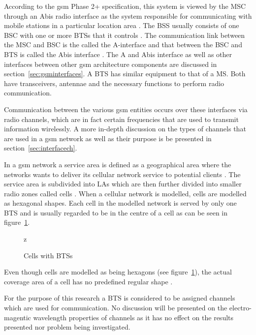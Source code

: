 According to the \gls{gsm} Phase 2+ specification, this system is viewed by the \gls{MSC} through an Abis radio interface as the system responsible for communicating with mobile stations in a particular location area \cite{Eisenblatter}. The \gls{BSS} usually consists of one \gls{BSC} with one or more \glspl{BTS} that it controls \cite{Eisenblatter}. The communication link between the \gls{MSC} and \gls{BSC} is the called the A-interface and that between the \gls{BSC} and \gls{BTS} is called the Abis interface \cite{Eisenblatter}. The A and Abis interface as well as other interfaces between other \gls{gsm} architecture components are discussed in section~\ref{sec:gsminterfaces}. A \gls{BTS} has similar equipment to that of a MS\cite{GSMSysEngin}. Both have transceivers, antennae and the necessary functions to perform radio communication. 

Communication between the various \gls{gsm} entities occurs over these interfaces via radio channels, which are in fact certain frequencies that are used to transmit information wirelessly. A more in-depth discussion on the types of channels that are used in a \gls{gsm} network as well as their purpose is be presented in section~\ref{sec:interfacech}.

In a \gls{gsm} network a service area is defined as a geographical area where the networks wants to deliver its cellular network service to potential clients \cite{GSMArchitectureProtocolsServices, Karen2004}. The service area is subdivided into \glspl{LA} which are then further divided into smaller radio zones called cells \cite{GSMSecurInTeleNetwork}. When a cellular network is modelled, cells are modelled as hexagonal shapes. Each cell in the modelled network is served by only one \gls{BTS} and is usually regarded to be in the centre of a cell as can be seen in figure~\ref{fig:GSMCell}\cite{GSMArchitectureProtocolsServices}. 
\begin{figure}[H]
	\begin{centering}
		
		\caption{Cells with BTSs}
		\label{fig:GSMCell}
	\end{centering}z
\end{figure}
Even though cells are modelled as being hexagons (see figure~\ref{fig:GSMCell}), the actual coverage area of a cell has no predefined regular shape \cite{GSMArchitectureProtocolsServices}.

For the purpose of this research a \gls{BTS} is considered to be assigned channels which are used for communication. No discussion will be presented on the electro-magentic wavelength properties of channels as it has no effect on the results presented nor problem being investigated.

